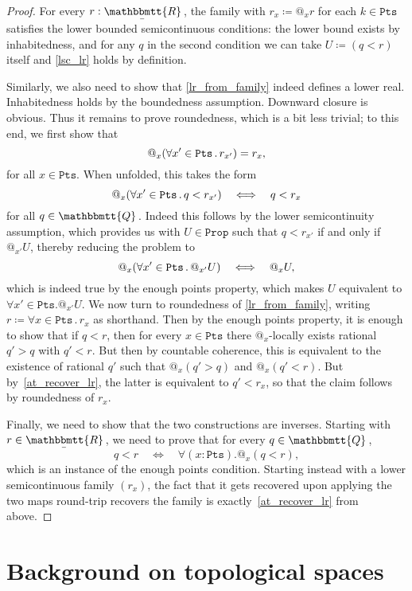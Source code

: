\documentclass[reqno,11pt]{amsproc}
\makeatletter
\theoremstyle{plain}
\theoremstyle{definition}
\newcommand{\Const}[1]{\mathtt{#1}}
\newcommand{\ubar}[1]{\underaccent{\bar}{#1}}
\newcommand{\internal}[1]{\raisebox{-.03ex}{$\mathbbmtt{#1}$}}
\newcommand{\hs}{\hspace{1pt}}
\newcommand{\tqq}{\internal{Q}\hs}
\newcommand{\trr}{\internal{R}}
\newcommand{\tlrr}{\ubar{\trr}\hs}
\newcommand{\prop}{\Const{Prop}}
\newcommand{\pt}{x}
\newcommand{\pts}{\mathtt{Pts}}		%
\newcommand{\atsymbol}{{@}}
\newcommand{\at}[1][\pt]{\atsymbol_{#1}}
\let\originalleft\left
\let\originalright\right
\renewcommand{\left}{\mathopen{}\mathclose\bgroup\originalleft}
\renewcommand{\right}{\aftergroup\egroup\originalright}
\newcommand{\beq}{\begin{equation}}
\newcommand{\eeq}{\end{equation}}
\numberwithin{equation}{section}
\makeatother
\begin{document}
\begin{proof}
	For every $r : \tlrr$, the family with $r_\pt\coloneqq \at r$ for each $k\in\pts$ satisfies the lower bounded semicontinuous conditions: the lower bound exists by inhabitedness, and for any $q$ in the second condition we can take $U \coloneqq (q < r)$ itself and \eqref{lsc_lr} holds by definition.

	Similarly, we also need to show that \eqref{lr_from_family} indeed defines a lower real.
	Inhabitedness holds by the boundedness assumption.
	Downward closure is obvious.
	Thus it remains to prove roundedness, which is a bit less trivial; to this end, we first show that
	\beq
		\label{at_recover_lr}
		\at \left( \forall \pt' \in \pts \, . \, r_{\pt'} \right) = r_\pt,
	\eeq
	for all $\pt \in \pts$. When unfolded, this takes the form
	\[
		\at \left( \forall \pt' \in \pts \, . \, q < r_{\pt'} \right) \quad \Longleftrightarrow \quad q < r_\pt
	\]
	for all $q \in \tqq$.
	Indeed this follows by the lower semicontinuity assumption, which provides us with $U \in \prop$ such that $q < r_{\pt'}$ if and only if $\at[x'] U$, thereby reducing the problem to
	\[
		\at \left( \forall \pt' \in \pts \, . \, \at[\pt'] U \right) \quad \Longleftrightarrow \quad \at U,
	\]
	which is indeed true by the enough points property, which makes $U$ equivalent to $\forall \pt' \in \pts . \at[\pt'] U$. We now turn to roundedness of \eqref{lr_from_family}, writing $r \coloneqq \forall \pt \in \pts \, . \, r_\pt$ as shorthand.
	Then by the enough points property, it is enough to show that if $q < r$, then for every $\pt \in \pts$ there $\at$-locally exists rational $q' > q$ with $q' < r$.
	But then by countable coherence, this is equivalent to the existence of rational $q'$ such that $\at (q' > q)$ and $\at (q' < r)$. But by~\eqref{at_recover_lr}, the latter is equivalent to $q' < r_\pt$, so that the claim follows by roundedness of $r_\pt$.

	Finally, we need to show that the two constructions are inverses. Starting with $r \in \tlrr$, we need to prove that for every $q \in \tqq$,
	\[
		q < r \quad \Longleftrightarrow \quad \forall (\pt : \pts) . \at (q < r),
	\]
	which is an instance of the enough points condition. Starting instead with a lower semicontinuous family $(r_\pt)$, the fact that it gets recovered upon applying the two maps round-trip recovers the family is exactly~\eqref{at_recover_lr} from above.
\end{proof}

\section{Background on topological spaces}
\end{document}
